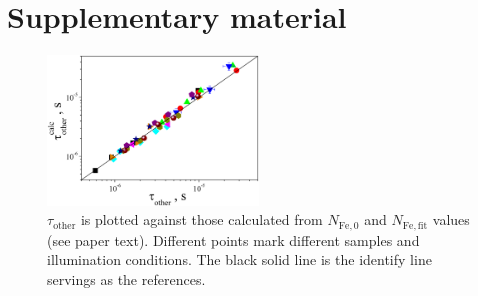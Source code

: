 \documentclass[%
 aip,jap,
 amsmath,amssymb,
preprint,%
]{revtex4-1}
\begin{document}
%

\section*{Supplementary material}

\begin{figure}[!b]
\includegraphics[width=0.5\textwidth]{FigS1}%
\caption{\label{Fig:TauOther}
$\tau_\mathrm{other}$ is plotted against those calculated from
$N_\mathrm{Fe,0}$ and $N_\mathrm{Fe,fit}$ values (see paper text).
Different points mark different samples and illumination conditions.
The black solid line is the identify line servings as the references.
}
\end{figure}
\end{document}
